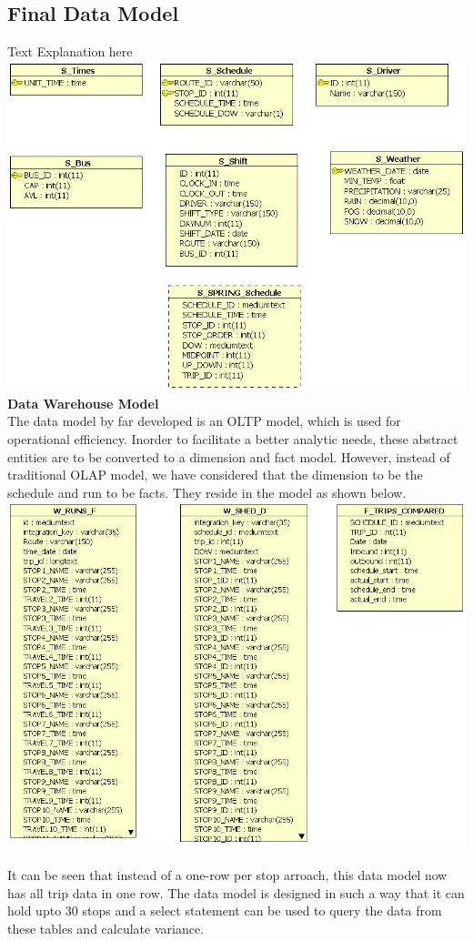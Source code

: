 \documentclass[12pt]{article}
\begin{document}
\subsection{Final Data Model}
Text Explanation here\\
\includegraphics[scale=0.5]{resources/Source_spring}\\[1cm] 
\textbf{Data Warehouse Model} \\
The data model by far developed is an OLTP model, which is used for operational efficiency. Inorder to facilitate a better analytic needs, these abstract entities are to be converted to a dimension and fact model. However, instead of traditional OLAP model, we have considered that the dimension to be the schedule and run to be facts. They reside in the model as shown below.\\
\includegraphics[scale=0.5]{resources/wh}\\[1cm] \\
It can be seen that instead of a one-row per stop arroach, this data model now has all trip data in one row. The data model is designed in such a way that it can hold upto 30 stops and a select statement can be used to query the data from these tables and calculate variance.
\end{document}
